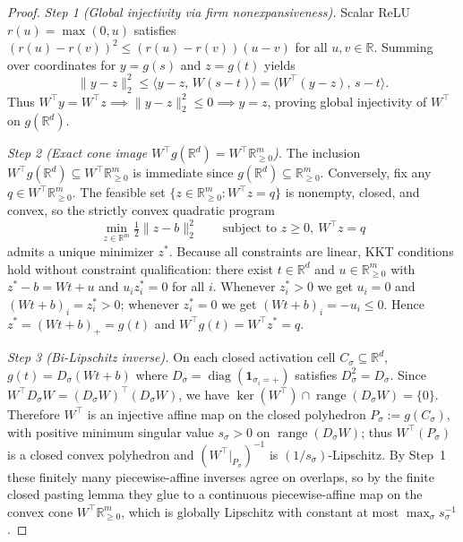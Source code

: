 \documentclass[11pt]{article}
\theoremstyle{plain}
\theoremstyle{definition}
\theoremstyle{remark}
\DeclareMathOperator{\diag}{diag}
\DeclareMathOperator{\range}{range}
\begin{document}
\begin{proof}
\emph{Step 1 (Global injectivity via firm nonexpansiveness).} Scalar ReLU $r(u) = \max(0, u)$ satisfies $(r(u) - r(v))^2 \le (r(u) - r(v))(u - v)$ for all $u, v \in \mathbb{R}$. Summing over coordinates for $y = g(s)$ and $z = g(t)$ yields
\begin{equation}\label{eq:firm}
\|y - z\|_2^2 \le \langle y - z,\, W(s - t) \rangle = \langle W^\top(y - z),\, s - t \rangle.
\end{equation}
Thus $W^\top y = W^\top z \implies \|y - z\|_2^2 \le 0 \implies y = z$, proving global injectivity of $W^\top$ on $g(\mathbb{R}^d)$.

\emph{Step 2 (Exact cone image $W^\top g(\mathbb{R}^d) = W^\top \mathbb{R}_{\ge 0}^m$).} The inclusion $W^\top g(\mathbb{R}^d) \subseteq W^\top \mathbb{R}_{\ge 0}^m$ is immediate since $g(\mathbb{R}^d) \subseteq \mathbb{R}_{\ge 0}^m$. Conversely, fix any $q \in W^\top \mathbb{R}_{\ge 0}^m$. The feasible set $\{z \in \mathbb{R}_{\ge 0}^m : W^\top z = q\}$ is nonempty, closed, and convex, so the strictly convex quadratic program
\[
\min_{z \in \mathbb{R}^m} \tfrac{1}{2}\|z - b\|_2^2 \qquad \text{subject to } z \ge 0,\ W^\top z = q
\]
admits a unique minimizer $z^*$. Because all constraints are linear, KKT conditions hold without constraint qualification: there exist $t \in \mathbb{R}^d$ and $u \in \mathbb{R}_{\ge 0}^m$ with $z^* - b = Wt + u$ and $u_i z^*_i = 0$ for all $i$. Whenever $z^*_i > 0$ we get $u_i = 0$ and $(Wt+b)_i = z^*_i > 0$; whenever $z^*_i = 0$ we get $(Wt+b)_i = -u_i \le 0$. Hence $z^* = (Wt+b)_+ = g(t)$ and $W^\top g(t) = W^\top z^* = q$.

\emph{Step 3 (Bi-Lipschitz inverse).} On each closed activation cell $C_\sigma \subseteq \mathbb{R}^d$, $g(t) = D_\sigma(Wt + b)$ where $D_\sigma = \diag(\mathbf{1}_{\sigma_i = +})$ satisfies $D_\sigma^2 = D_\sigma$. Since $W^\top D_\sigma W = (D_\sigma W)^\top (D_\sigma W)$, we have $\ker(W^\top) \cap \range(D_\sigma W) = \{0\}$. Therefore $W^\top$ is an injective affine map on the closed polyhedron $P_\sigma := g(C_\sigma)$, with positive minimum singular value $s_\sigma > 0$ on $\range(D_\sigma W)$; thus $W^\top(P_\sigma)$ is a closed convex polyhedron and $(W^\top|_{P_\sigma})^{-1}$ is $(1/s_\sigma)$-Lipschitz. By Step~1 these finitely many piecewise-affine inverses agree on overlaps, so by the finite closed pasting lemma they glue to a continuous piecewise-affine map on the convex cone $W^\top \mathbb{R}_{\ge 0}^m$, which is globally Lipschitz with constant at most $\max_\sigma s_\sigma^{-1}$.
\end{proof}
\end{document}
